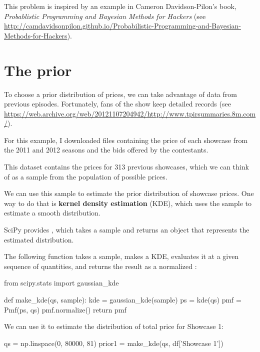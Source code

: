 \documentclass[12pt]{book}
\theoremstyle{exercise}
\begin{document}

This problem is inspired by an example in Cameron Davidson-Pilon's
book, {\it Probablistic Programming and Bayesian Methods for Hackers}
(see \url{http://camdavidsonpilon.github.io/Probabilistic-Programming-and-Bayesian-Methods-for-Hackers}).



\section{The prior}

To choose a prior distribution of prices, we can take advantage
of data from previous episodes.  
Fortunately, fans of the show keep detailed records (see \url{https://web.archive.org/web/20121107204942/http://www.tpirsummaries.8m.com/}).  

For this example, I downloaded files containing the price of each showcase from the 2011 and 2012 seasons and the bids offered by the contestants.

This dataset contains the prices for 313 previous showcases, which we can think of as a sample from the population of possible prices.

We can use this sample to estimate the prior distribution of showcase prices.
One way to do that is {\bf kernel density estimation} (KDE), which uses the sample to estimate a smooth distribution.

SciPy provides , which takes a sample and returns an object that represents the estimated distribution.

The following function takes a sample, makes a KDE, evaluates it at a given sequence of quantities, and returns the result as a normalized :

\begin{code}
from scipy.stats import gaussian_kde

def make_kde(qs, sample):
    kde = gaussian_kde(sample)
    ps = kde(qs)
    pmf = Pmf(ps, qs)
    pmf.normalize()
    return pmf
\end{code}

We can use it to estimate the distribution of total price for Showcase 1:

\begin{code}
qs = np.linspace(0, 80000, 81)
prior1 = make_kde(qs, df['Showcase 1'])
\end{code}
\end{document}
